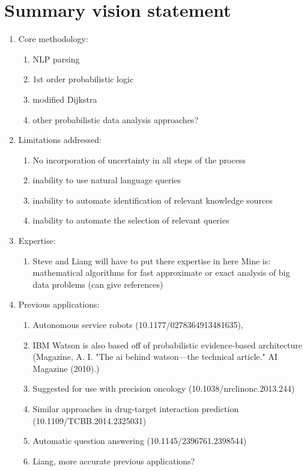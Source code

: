 \documentclass[11pt,notitlepage]{article}
\begin{document}
\section{Summary vision statement}
\begin{enumerate}
 \item Core methodology:
        \begin{enumerate}
        \item  NLP parsing
        \item  1st order probabilistic logic
        \item modified Dijkstra
        \item other probabilistic data analysis approaches?
  		\end{enumerate}
 \item Limitations addressed:
        \begin{enumerate}
        \item No incorporation of uncertainty in all steps of the process
        \item inability to use natural language queries
        \item inability to automate identification of relevant knowledge sources
        \item inability to automate the selection of relevant queries
        \end{enumerate}
 \item Expertise:
 		\begin{enumerate}
        \item Steve and Liang will have to put there expertise in here
        Mine is: mathematical algorithms for fast approximate or exact analysis of big data problems (can give references)
        \end{enumerate}
 \item Previous applications:
 		\begin{enumerate}
        \item Autonomous service robots (10.1177/0278364913481635),
        \item IBM Watson is also based off of probabilistic evidence-based architecture (Magazine, A. I. "The ai behind watson—the technical article." AI Magazine (2010).)
        \item Suggested for use with precision oncology (10.1038/nrclinonc.2013.244)
        \item Similar approaches in drug-target interaction prediction (10.1109/TCBB.2014.2325031)
        \item Automatic question answering (10.1145/2396761.2398544)
        \item Liang, more accurate previous applications?
        \end{enumerate}
\end{enumerate}
\end{document}
